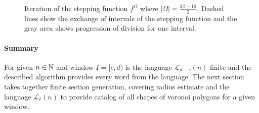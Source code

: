 \documentclass[text.tex]{subfiles}
\begin{document}
\begin{figure}
\begin{center}
\end{center}
\label{pic:iteration}
\caption{Iteration of the stepping function $f^{\Omega}$ where $|\Omega| = \frac{3\beta-10}{2}$. Dashed lines show the exchange of intervals of the stepping function and the gray area shows progression of division for one interval.} 
\end{figure}

\paragraph{Summary}
For given $n\in\mathbb{N}$ and window $I=[c,d)$ is the language $\mathcal{L}_{d-c}(n)$ finite and the described algorithm provides every word from the language. The next section takes together finite section generation, covering radius estimate and the language $\mathcal{L}_{\ell}(n)$ to provide catalog of all shapes of voronoi polygons for a given window.
\end{document}
